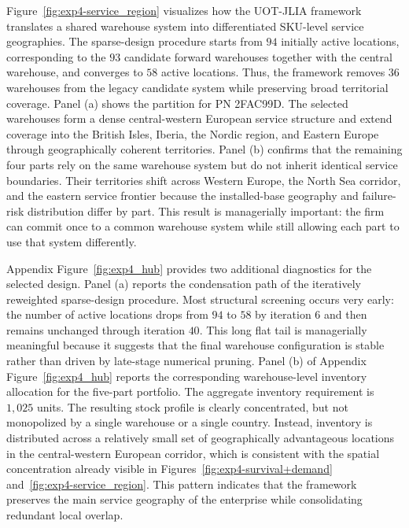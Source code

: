 \documentclass[a4paper,fleqn]{cas-sc}
\theoremstyle{remark}
\theoremstyle{plain}
\begin{document}
Figure~\ref{fig:exp4-service_region} visualizes how the UOT-JLIA framework translates a shared warehouse system into differentiated SKU-level service geographies. The sparse-design procedure starts from $94$ initially active locations, corresponding to the $93$ candidate forward warehouses together with the central warehouse, and converges to $58$ active locations. Thus, the framework removes $36$ warehouses from the legacy candidate system while preserving broad territorial coverage. Panel (a) shows the partition for PN 2FAC99D. The selected warehouses form a dense central-western European service structure and extend coverage into the British Isles, Iberia, the Nordic region, and Eastern Europe through geographically coherent territories. Panel (b) confirms that the remaining four parts rely on the same warehouse system but do not inherit identical service boundaries. Their territories shift across Western Europe, the North Sea corridor, and the eastern service frontier because the installed-base geography and failure-risk distribution differ by part. This result is managerially important: the firm can commit once to a common warehouse system while still allowing each part to use that system differently.

Appendix Figure~\ref{fig:exp4_hub} provides two additional diagnostics for the selected design. Panel (a) reports the condensation path of the iteratively reweighted sparse-design procedure. Most structural screening occurs very early: the number of active locations drops from $94$ to $58$ by iteration $6$ and then remains unchanged through iteration $40$. This long flat tail is managerially meaningful because it suggests that the final warehouse configuration is stable rather than driven by late-stage numerical pruning. Panel (b) of Appendix Figure~\ref{fig:exp4_hub} reports the corresponding warehouse-level inventory allocation for the five-part portfolio. The aggregate inventory requirement is $1{,}025$ units. The resulting stock profile is clearly concentrated, but not monopolized by a single warehouse or a single country. Instead, inventory is distributed across a relatively small set of geographically advantageous locations in the central-western European corridor, which is consistent with the spatial concentration already visible in Figures~\ref{fig:exp4-survival+demand} and~\ref{fig:exp4-service_region}. This pattern indicates that the framework preserves the main service geography of the enterprise while consolidating redundant local overlap.
\end{document}
